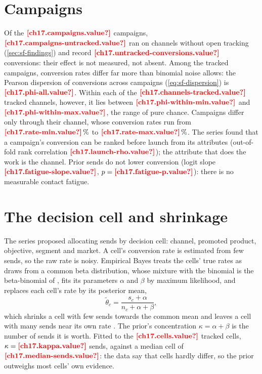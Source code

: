 \section{Campaigns}\label{sec:pc-campaigns}

Of the $\est{ch17.campaigns}{value}$ campaigns, $\est{ch17.campaigns-untracked}{value}$ ran on channels without open tracking
(\cref{sec:sf-findings}) and record $\est{ch17.untracked-conversions}{value}$ conversions: their effect is not measured, not
absent. Among the tracked campaigns, conversion rates differ far more than binomial noise allows: the Pearson dispersion of
conversions across campaigns (\cref{eq:sf-dispersion}) is $\est{ch17.phi-all}{value}$. Within each of the
$\est{ch17.channels-tracked}{value}$ tracked channels, however, it lies between $\est{ch17.phi-within-min}{value}$ and
$\est{ch17.phi-within-max}{value}$, the range of pure chance. Campaigns differ only through their channel, whose conversion
rates run from $\est{ch17.rate-min}{value}\,\%$ to $\est{ch17.rate-max}{value}\,\%$. The series found that a campaign's
conversion can be ranked before launch from its attributes (out-of-fold rank correlation $\est{ch17.launch-rho}{value}$); the
attribute that does the work is the channel. Prior sends do not lower conversion (logit slope $\est{ch17.fatigue-slope}{value}$,
$p = \est{ch17.fatigue-p}{value}$): there is no measurable contact fatigue.

\section{The decision cell and shrinkage}\label{sec:pc-cells}

The series proposed allocating sends by decision cell: channel, promoted product, objective, segment and market. A cell's
conversion rate is estimated from few sends, so the raw rate is noisy. Empirical Bayes treats the cells' true rates as draws
from a common beta distribution, whose mixture with the binomial is the beta-binomial of \textcite{skellam1948}, fits its
parameters $\alpha$ and $\beta$ by maximum likelihood, and replaces each cell's rate by its posterior mean,
\begin{equation}\label{eq:pc-eb}
  \tilde\theta_c = \frac{s_c + \alpha}{n_c + \alpha + \beta},
\end{equation}
which shrinks a cell with few sends towards the common mean and leaves a cell with many sends near its own rate
\autocite{efron1975}. The prior's concentration $\kappa = \alpha + \beta$ is the number of sends it is worth. Fitted to the
$\est{ch17.cells}{value}$ tracked cells, $\kappa = \est{ch17.kappa}{value}$ sends, against a median cell of
$\est{ch17.median-sends}{value}$: the data say that cells hardly differ, so the prior outweighs most cells' own evidence.

